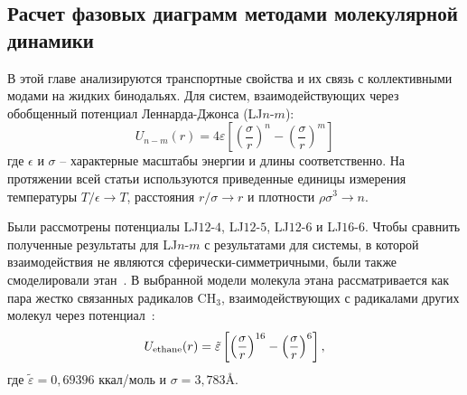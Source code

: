 \subsection{Расчет фазовых диаграмм методами молекулярной динамики}
\label{MACR-SubSecMD}

В этой главе анализируются транспортные свойства и их связь с коллективными модами на жидких бинодальях.
Для систем, взаимодействующих через обобщенный потенциал Леннарда-Джонса (LJ$n$-$m$):
\begin{equation}
  U_{n-m}(r)=4 \varepsilon\left[\left(\frac{\sigma}{r}\right)^{n}-\left(\frac{\sigma}{r}\right)^{m}\right]
  \label{MACR-eq1}
\end{equation}
где $\epsilon$ и $\sigma$ -- характерные масштабы энергии и длины соответственно.
На протяжении всей статьи используются приведенные единицы измерения температуры $ T/ \epsilon \rightarrow T $, расстояния $ r/ \sigma \rightarrow r $ и плотности $ \rho \sigma ^ 3 \rightarrow n$.


Были рассмотрены потенциалы LJ$12$-$4$, LJ$12$-$5$, LJ$12$-$6$ и LJ$16$-$6$.
Чтобы сравнить полученные результаты для LJ$n$-$m$ с результатами для системы, в которой взаимодействия не являются сферически-симметричными, были также смоделировали этан~\cite{10.1021/acs.jced.6b01036}.
В выбранной модели молекула этана рассматривается как пара жестко связанных радикалов CH$_3$, взаимодействующих с радикалами других молекул через потенциал~\cite{10.1021/acs.jced.6b01036}:
\begin{equation}
  U_{\rm {ethane}}(r) = \tilde \varepsilon\left[\left(\frac{\sigma}{r}\right)^{16}-\left(\frac{\sigma}{r}\right)^{6}\right],
  \label{MACR-eq2}
\end{equation}
где $\tilde\varepsilon = 0,69396$ ккал/моль и $\sigma = 3,783$\AA.

